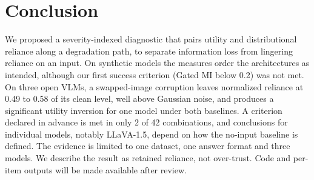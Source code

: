\documentclass[graybox]{svmult}
\newcommand{\checknum}[2]{#1}
\begin{document}
\section{Conclusion}
\label{sec:conclusion}

We proposed a severity-indexed diagnostic that pairs utility and
distributional reliance along a degradation path, to separate information
loss from lingering reliance on an input. On synthetic models the measures
order the architectures as intended, although our first success criterion
(Gated MI below 0.2) was not met. On three open VLMs, a swapped-image
corruption leaves normalized reliance at 0.49 to 0.58 of its clean level,
well above Gaussian noise, and produces a significant utility inversion for
one model under both baselines. A criterion declared in advance is met in
only \checknum{2}{criterion:status:count_met} of 42 combinations, and
conclusions for individual models, notably LLaVA-1.5, depend on how the
no-input baseline is defined. The evidence is limited to one dataset, one
answer format and three models. We describe the result as retained
reliance, not over-trust.
Code and per-item outputs will be made available after review.



\end{document}
